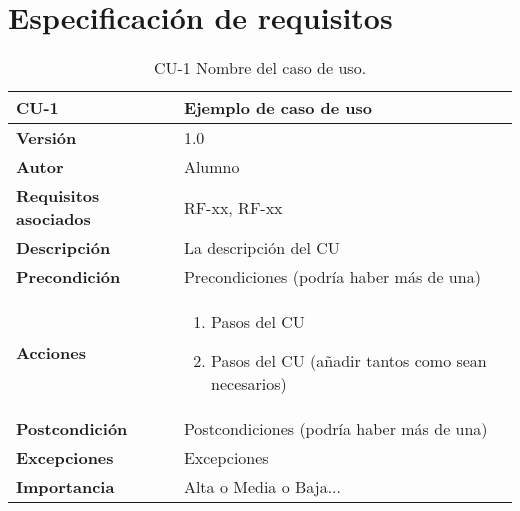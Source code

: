 \section{Especificación de requisitos}

\begin{table}[p]
	\centering
	\begin{tabularx}{\linewidth}{ p{} p{} }
		\toprule
		\textbf{CU-1}    & \textbf{Ejemplo de caso de uso}\\
		\toprule
		\textbf{Versión}              & 1.0    \\
		\textbf{Autor}                & Alumno \\
		\textbf{Requisitos asociados} & RF-xx, RF-xx \\
		\textbf{Descripción}          & La descripción del CU \\
		\textbf{Precondición}         & Precondiciones (podría haber más de una) \\
		\textbf{Acciones}             &
		\begin{enumerate}
			\def\labelenumi{\arabic{enumi}.}
			\tightlist
			\item Pasos del CU
			\item Pasos del CU (añadir tantos como sean necesarios)
		\end{enumerate}\\
		\textbf{Postcondición}        & Postcondiciones (podría haber más de una) \\
		\textbf{Excepciones}          & Excepciones \\
		\textbf{Importancia}          & Alta o Media o Baja... \\
		\bottomrule
	\end{tabularx}
	\caption{CU-1 Nombre del caso de uso.}
\end{table}

